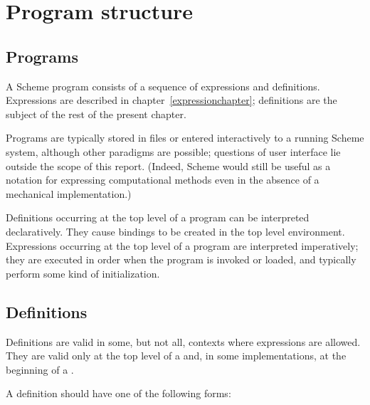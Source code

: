 \chapter{Program structure}
\label{programchapter}

\section{Programs}

A Scheme program consists of a sequence of expressions and definitions.
Expressions are described in chapter~\ref{expressionchapter};
definitions are the subject of the rest of the present chapter.

Programs are typically stored in files or entered interactively to a
running Scheme system, although other paradigms are possible;
questions of user interface lie outside the scope of this report.
(Indeed, Scheme would still be useful as a notation for expressing
computational methods even in the absence of a mechanical
implementation.)

Definitions occurring at the top level of a program can be interpreted
declaratively.  They cause bindings to be created in the top level
environment.  Expressions occurring at the top level of a program are
interpreted imperatively; they are executed in order when the program is
invoked or loaded, and typically perform some kind of initialization.



\section{Definitions}

Definitions are valid in some, but not all, contexts where expressions
are allowed.  They are valid only at the top level of a 
and, in some implementations, at the beginning of a .

A definition should have one of the following forms:

